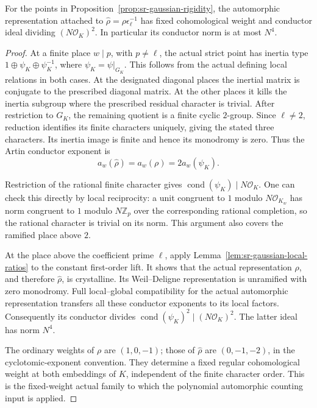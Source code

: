 \begin{srlemma}
\label{lem:sr-gaussian-actual-level}
For the points in Proposition~\ref{prop:sr-gaussian-rigidity},
the automorphic representation attached to
\(\widehat\rho=\rho\epsilon_\ell^{-1}\) has fixed cohomological
weight and conductor ideal dividing
\((N\mathcal O_K)^2\). In particular its conductor norm is
at most \(N^4\).
\end{srlemma}
\begin{proof}
At a finite place \(w\mid p\), with \(p\ne\ell\), the actual strict point has
inertia type
\(1\oplus\psi_K\oplus\psi_K^{-1}\), where
\(\psi_K=\psi|_{G_K}\).
This follows from the actual defining local relations in
both cases. At the designated diagonal places the inertial
matrix is conjugate to the prescribed diagonal matrix.
At the other places it kills the inertia subgroup where
the prescribed residual character is trivial.
After restriction to \(G_K\), the remaining quotient is a finite cyclic \(2\)-group.
Since \(\ell\ne2\), reduction identifies its finite
characters uniquely, giving the stated three characters.
Its inertia image is finite and hence its monodromy is zero.
Thus the Artin conductor exponent is
\[
 a_w(\widehat\rho)=a_w(\rho)=2a_w(\psi_K).
\]

Restriction of the rational finite character gives
\(\operatorname{cond}(\psi_K)\mid N\mathcal O_K\).
One can check this directly by local reciprocity:
a unit congruent to \(1\) modulo \(N\mathcal O_{K_w}\)
has norm congruent to \(1\) modulo \(N\mathbb Z_p\)
over the corresponding rational completion, so the
rational character is trivial on its norm.
This argument also covers the ramified place above \(2\).

At the place above the coefficient prime \(\ell\),
apply Lemma~\ref{lem:sr-gaussian-local-ratios} to the
constant first-order lift.
It shows that the actual representation \(\rho\), and
therefore \(\widehat\rho\), is crystalline.
Its Weil--Deligne representation is unramified with zero
monodromy.
Full local--global compatibility for the actual automorphic
representation transfers all these conductor exponents
to its local factors.
Consequently its conductor divides
\(\operatorname{cond}(\psi_K)^2\mid(N\mathcal O_K)^2\).
The latter ideal has norm \(N^4\).

The ordinary weights of \(\rho\) are \((1,0,-1)\);
those of \(\widehat\rho\) are \((0,-1,-2)\), in the
cyclotomic-exponent convention.
They determine a fixed regular cohomological weight at
both embeddings of \(K\), independent of the finite
character order.
This is the fixed-weight actual family to which the
polynomial automorphic counting input is applied.
\end{proof}

